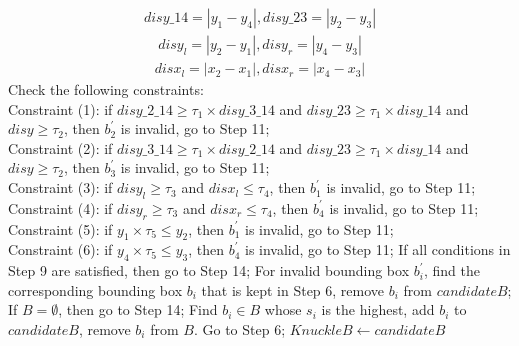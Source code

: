 \begin{algorithm}[h!]
\begin{algorithmic}[1]
{\begin{equation}
\begin{aligned}
                    disy\_14 = \left|y_1-y_4\right|, disy\_23=\left|y_2-y_3\right|
                \end{aligned}
                \label{equation-4}
            \end{equation}
            \begin{equation}
                \begin{aligned}
                    disy_l = \left|y_2-y_1\right|, disy_r=\left|y_4-y_3\right|
                \end{aligned}
                \label{equation-5}
            \end{equation}
            \begin{equation}
                \begin{aligned}
                    disx_l = \left|x_2-x_1\right|, disx_r=\left|x_4-x_3\right|
                \end{aligned}
                \label{equation-6}
            \end{equation}}
        \vspace{-0.2in}
        \STATE Check the following constraints:\\
        \footnotesize{
        Constraint (1): if $disy\_2\_14 \ge \tau_1 \times disy\_3\_14$ and $disy\_23 \ge \tau_1 \times disy\_14$ and $disy \ge \tau_2$, then $b_2^{'}$ is invalid, go to Step 11;\\
        Constraint (2): if $disy\_3\_14 \ge  \tau_1 \times disy\_2\_14$ and $disy\_23 \ge \tau_1 \times disy\_14$ and $disy \ge \tau_2$, then $b_3^{'}$ is invalid, go to Step 11;\\
        Constraint (3): if $disy_l \ge \tau_3$ and $disx_l \le \tau_4$, then $b_1^{'}$ is invalid, go to Step 11;\\
        Constraint (4): if $disy_r \ge \tau_3$ and $disx_r \le \tau_4$, then $b_4^{'}$ is invalid, go to Step 11;\\
        Constraint (5): if $y_1 \times \tau_5 \le y_2$, then $b_1^{'}$ is invalid, go to Step 11;\\
        Constraint (6): if $y_4 \times \tau_5 \le y_3$, then $b_4^{'}$ is invalid, go to Step 11;}
        \STATE If all conditions in Step 9 are satisfied, then go to Step 14;
        \STATE For invalid bounding box $b_i^{'}$, find the corresponding bounding box $b_i$ that is kept in Step 6, remove $b_i$ from $candidateB$;
        \STATE If $B = \emptyset$, then go to Step 14;
        \STATE Find $b_i \in B$ whose $s_i$ is the highest, add $b_i$ to $candidateB$, remove $b_i$ from $B$. Go to Step 6;
        \STATE $KnuckleB \gets candidateB$

    \end{algorithmic}
\end{algorithm}

